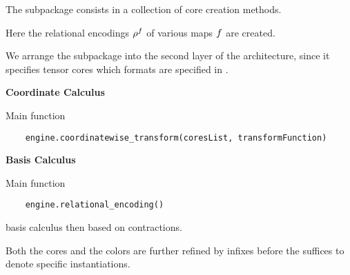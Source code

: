 








\label{sec:implementationRepresentation}

The \sprepresentation subpackage consists in a collection of core creation methods.

Here the relational encodings $\rho^{f}$ of various maps $f$ are created.


We arrange the \sprepresentation subpackage into the second layer of the \tnreason architecture, since it specifies tensor cores which formats are specified in \spengine.




\textbf{Coordinate Calculus}

Main function
\begin{lstlisting}
	engine.coordinatewise_transform(coresList, transformFunction)
\end{lstlisting}

\textbf{Basis Calculus}

Main function
\begin{lstlisting}
	engine.relational_encoding()
\end{lstlisting}
basis calculus then based on contractions.








Both the cores and the colors are further refined by infixes before the suffices to denote specific instantiations.

